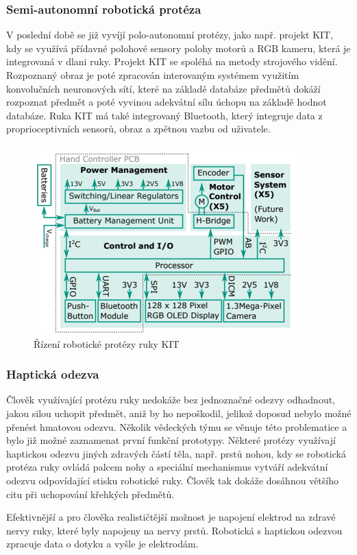 \documentclass[a4paper,12pt]{article}
\begin{document}
\subsubsection{Semi-autonomní robotická protéza}
V poslední době se již vyvíjí polo-autonomní protézy, jako např. projekt KIT, kdy se využívá přídavné polohové sensory polohy motorů a RGB kameru, která je integrovaná v dlani ruky. Projekt KIT se spoléhá na metody strojového vidění. Rozpoznaný obraz je poté zpracován interovaným systémem využitím konvolučních neuronových sítí, které na základě databáze předmětů dokáží rozpoznat předmět a poté vyvinou adekvátní sílu úchopu na základě hodnot databáze. Ruka KIT má také integrovaný Bluetooth, který integruje data z proprioceptivních sensorů, obraz a zpětnou vazbu od uživatele.\cite{KIT}

\begin{figure}[hbtp]
\centering
\includegraphics[scale=1]{figures/Camera_hand.PNG}
\caption{Řízení robotické protézy ruky KIT \cite{KIT}}
\end{figure}

\subsubsection{Haptická odezva}
Člověk využívající protézu ruky nedokáže bez jednoznačné odezvy odhadnout, jakou silou uchopit předmět, aniž by ho nepoškodil, jelikož doposud nebylo možné přenést hmatovou odezvu. Několik vědeckých týmu se věnuje této problematice a bylo již možné zaznamenat první funkční prototypy. Některé protézy využívají haptickou odezvu jiných zdravých částí těla, např. prstů nohou, kdy se robotická protéza ruky ovládá palcem nohy a speciální mechanismus vytváří adekvátní odezvu odpovídající stisku robotické ruky. Člověk tak dokáže dosáhnou většího citu při uchopování křehkých předmětů.\cite{Fukushima}\par
Efektivnější a pro člověka realističtější možnost je napojení elektrod na zdravé nervy ruky, které byly napojeny na nervy prstů. Robotická s haptickou odezvou zpracuje data o dotyku a vyšle je elektrodám.\cite{Haptic}
\pagebreak
\end{document}
